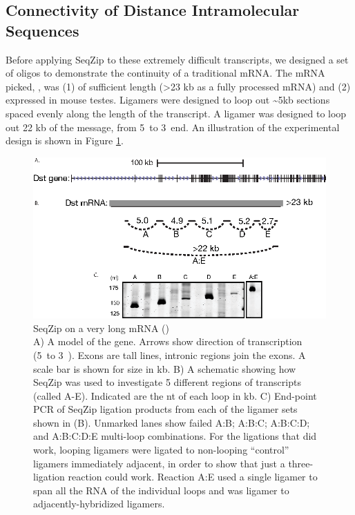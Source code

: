   \subsection{Connectivity of Distance Intramolecular Sequences}
    \label{SeqZipMethod:subsec:SeqZip on long RNAs at multiple locations}

    Before applying SeqZip to these extremely difficult transcripts, we designed a set of oligos to demonstrate the continuity of a traditional mRNA. The mRNA picked, \dst{}, was (1) of sufficient length (>23 kb as a fully processed mRNA) and (2) expressed in mouse testes. Ligamers were designed to loop out \textasciitilde5kb sections spaced evenly along the length of the transcript. A ligamer was designed to loop out 22 kb of the message, from 5\textprime~to 3\textprime~end. An illustration of the experimental design is shown in Figure \ref{SeqZipMethod:fig:SeqZip on dst1}.

    \begin{figure} %
      \centering 
      \includegraphics{Figures/SeqZipMethod/dst1.eps}
      \caption[SeqZip on a very long mRNA (\dst{})]
      {
        SeqZip on a very long mRNA (\dst{})\\[0.25cm]
        A) A model of the \dst{} gene. Arrows show direction of transcription (5\textprime~to 3\textprime~). Exons are tall lines, intronic regions join the exons. A scale bar is shown for size in kb. B) A schematic showing how SeqZip was used to investigate 5 different regions of \dst{} transcripts (called A-E). Indicated are the nt of each loop in kb. C) End-point PCR of SeqZip ligation products from each of the ligamer sets shown in (B). 
        Unmarked lanes show failed A:B; A:B:C; A:B:C:D; and A:B:C:D:E multi-loop combinations. For the ligations that did work, looping ligamers were ligated to non-looping ``control'' ligamers immediately adjacent, in order to show that just a three-ligation reaction could work. Reaction A:E used a single ligamer to span all the RNA of the individual loops and was ligamer to adjacently-hybridized ligamers.
        }
      \label{SeqZipMethod:fig:SeqZip on dst1}
      \end{figure}
        
